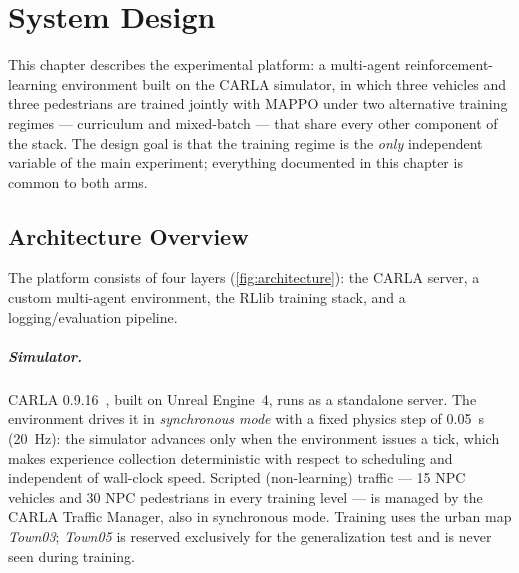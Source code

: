 \chapter{System Design}
\label{ch:system}

This chapter describes the experimental platform: a multi-agent
reinforcement-learning environment built on the CARLA simulator, in which
three vehicles and three pedestrians are trained jointly with MAPPO under
two alternative training regimes --- curriculum and mixed-batch --- that
share every other component of the stack. The design goal is that the
training regime is the \emph{only} independent variable of the main
experiment; everything documented in this chapter is common to both arms.

\section{Architecture Overview}
\label{sec:architecture}

The platform consists of four layers (\cref{fig:architecture}): the CARLA
server, a custom multi-agent environment, the RLlib training stack, and a
logging/evaluation pipeline.

\paragraph{Simulator.}
CARLA 0.9.16~\cite{dosovitskiy2017carla}, built on Unreal Engine~4, runs as
a standalone server. The environment drives it in \emph{synchronous mode}
with a fixed physics step of \SI{0.05}{s} (\SI{20}{Hz}): the simulator
advances only when the environment issues a tick, which makes experience
collection deterministic with respect to scheduling and independent of
wall-clock speed. Scripted (non-learning) traffic --- 15 NPC vehicles and
30 NPC pedestrians in every training level --- is managed by the CARLA
Traffic Manager, also in synchronous mode. Training uses the urban map
\emph{Town03}; \emph{Town05} is reserved exclusively for the
generalization test and is never seen during training.

